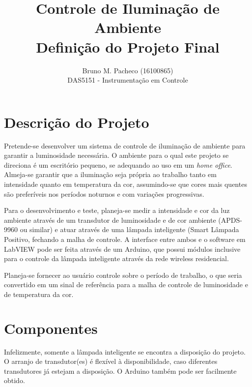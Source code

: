 \documentclass[a4paper]{report}
\begin{document}
 
\title{Controle de Iluminação de Ambiente\\Definição do Projeto Final}
\author{Bruno M. Pacheco (16100865) \\
DAS5151 - Instrumentação em Controle}
 
\maketitle

\section*{Descrição do Projeto}

Pretende-se desenvolver um sistema de controle de iluminação de ambiente para garantir a luminosidade necessária. O ambiente para o qual este projeto se direciona é um escritório pequeno, se adequando ao uso em um \emph{home office}. Almeja-se garantir que a iluminação seja própria ao trabalho tanto em intensidade quanto em temperatura da cor, assumindo-se que cores mais quentes são preferíveis nos períodos noturnos e com variações progressivas.

Para o desenvolvimento e teste, planeja-se medir a intensidade e cor da luz ambiente através de um transdutor de luminosidade e de cor ambiente (APDS-9960 ou similar) e atuar através de uma lâmpada inteligente (Smart Lâmpada Positivo, fechando a malha de controle. A interface entre ambos e o software em LabVIEW pode ser feita através de um Arduino, que possui módulos inclusive para o controle da lâmpada inteligente através da rede wireless residencial.

Planeja-se fornecer ao usuário controle sobre o período de trabalho, o que seria convertido em um sinal de referência para a malha de controle de luminosidade e de temperatura da cor.

\section*{Componentes}

Infelizmente, somente a lâmpada inteligente se encontra a disposição do projeto. O arranjo de transdutor(es) é flexível à disponibilidade, caso diferentes transdutores já estejam a disposição. O Arduino também pode ser facilmente obtido.
\end{document}
